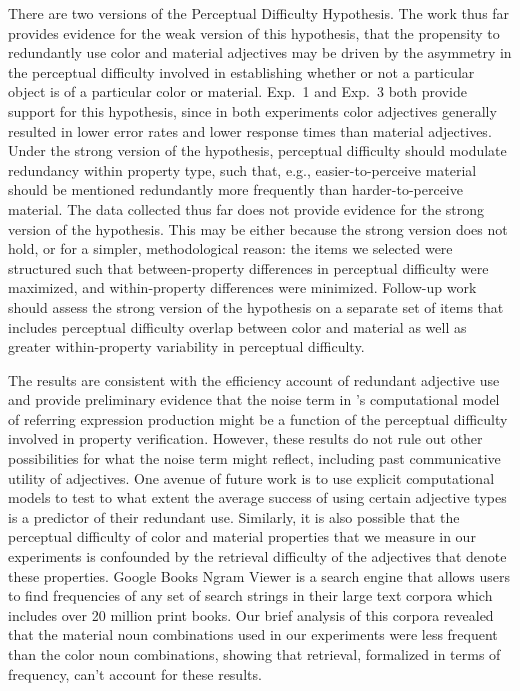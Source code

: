 \documentclass[12pt,letterpaper]{article}
\begin{document}
There are two versions of the Perceptual Difficulty Hypothesis. The work thus far provides evidence for the weak version of this hypothesis, that the propensity to redundantly use color and material adjectives may be driven by the asymmetry in the perceptual difficulty involved in establishing whether or not a particular object is of a particular color or material. Exp.~1 and Exp.~3 both provide support for this hypothesis, since in both experiments color adjectives generally resulted in lower error rates and lower response times than material adjectives. Under the strong version of the hypothesis, perceptual difficulty should modulate redundancy within property type, such that, e.g., easier-to-perceive material should be mentioned redundantly more frequently than  harder-to-perceive material. The data collected thus far does not provide evidence for the strong version of the hypothesis. This may be either because the strong version does not hold, or for a simpler, methodological reason: the items we selected were structured such that between-property differences in perceptual difficulty were maximized, and within-property differences were minimized. Follow-up work should assess the strong version of the hypothesis on a separate set of items that includes perceptual difficulty overlap between color and material as well as greater within-property variability in perceptual difficulty. 

The results are consistent with the efficiency account of redundant adjective use and provide preliminary evidence that the noise term in \citet{DegenEtAl2020}'s computational model of referring expression production might be a function of the perceptual difficulty involved in property verification. However, these results do not rule out other possibilities for what the noise term might reflect, including past communicative utility of adjectives. One avenue of future work is to use explicit computational models to test to what extent the average success of using certain adjective types is a predictor of their redundant use. Similarly, it is also possible that the perceptual difficulty of color and material properties that we measure in our experiments is confounded by the retrieval difficulty of the adjectives that denote these properties. Google Books Ngram Viewer is a search engine that allows users to find frequencies of any set of search strings in their large text corpora which includes over 20 million print books. Our brief analysis of this corpora revealed that the material noun combinations used in our experiments were less frequent than the color noun combinations, showing that retrieval, formalized in terms of frequency, can't account for these results. 
\end{document}
